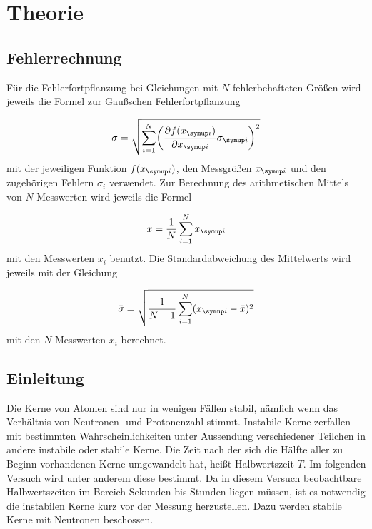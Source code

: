 \section{Theorie}
\label{sec:Theorie}

\subsection{Fehlerrechnung}

Für die Fehlerfortpflanzung bei Gleichungen mit $N$ fehlerbehafteten Größen
wird jeweils die Formel zur Gaußschen Fehlerfortpflanzung

\begin{equation*}
  \sigma = \sqrt{\sum_{i=1}^{N}\biggl(\frac{\partial f(x_{\g{i}})}{\partial x_{\g{i}}}
  \sigma_{\g{i}}\biggr)^2}
\end{equation*}
mit der jeweiligen Funktion $f(x_{\g{i}})$, den Messgrößen $x_{\g{i}}$ und den
zugehörigen Fehlern $\sigma_i$ verwendet.
Zur Berechnung des arithmetischen Mittels von $N$ Messwerten wird jeweils die
Formel

\begin{equation*}
  \bar{x} = \frac{1}{N}\sum_{i=1}^{N}x_{\g{i}}
\end{equation*}
mit den Messwerten $x_i$ benutzt.
Die Standardabweichung des Mittelwerts wird jeweils mit der Gleichung

\begin{equation*}
  \bar{\sigma} = \sqrt{\frac{1}{N-1}\sum_{i=1}^{N}(x_{\g{i}} - \bar{x})^2}
\end{equation*}
mit den $N$ Messwerten $x_i$ berechnet.

\subsection{Einleitung}

Die Kerne von Atomen sind nur in wenigen Fällen stabil, nämlich wenn das Verhältnis
von Neutronen- und Protonenzahl stimmt. Instabile Kerne zerfallen mit bestimmten
Wahrscheinlichkeiten unter Aussendung verschiedener Teilchen in andere
instabile oder stabile Kerne. Die Zeit nach der sich die Hälfte aller zu Beginn
vorhandenen Kerne umgewandelt hat, heißt Halbwertszeit $T$. Im folgenden Versuch wird
unter anderem diese bestimmt. Da in diesem Versuch beobachtbare Halbwertszeiten im Bereich Sekunden bis
Stunden liegen müssen, ist es notwendig die instabilen Kerne kurz vor der Messung
herzustellen. Dazu werden stabile Kerne mit Neutronen beschossen.

